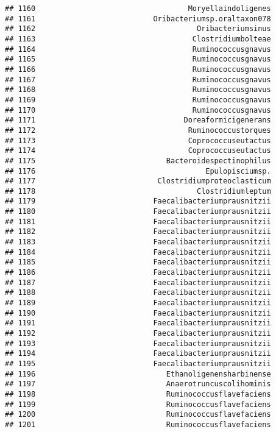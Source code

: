 \documentclass[
]{article}
\begin{document}
\begin{verbatim}
## 1160                                   Moryellaindoligenes
## 1161                           Oribacteriumsp.oraltaxon078
## 1162                                     Oribacteriumsinus
## 1163                                    Clostridiumbolteae
## 1164                                    Ruminococcusgnavus
## 1165                                    Ruminococcusgnavus
## 1166                                    Ruminococcusgnavus
## 1167                                    Ruminococcusgnavus
## 1168                                    Ruminococcusgnavus
## 1169                                    Ruminococcusgnavus
## 1170                                    Ruminococcusgnavus
## 1171                                  Doreaformicigenerans
## 1172                                   Ruminococcustorques
## 1173                                   Coprococcuseutactus
## 1174                                   Coprococcuseutactus
## 1175                              Bacteroidespectinophilus
## 1176                                       Epulopisciumsp.
## 1177                            Clostridiumproteoclasticum
## 1178                                     Clostridiumleptum
## 1179                           Faecalibacteriumprausnitzii
## 1180                           Faecalibacteriumprausnitzii
## 1181                           Faecalibacteriumprausnitzii
## 1182                           Faecalibacteriumprausnitzii
## 1183                           Faecalibacteriumprausnitzii
## 1184                           Faecalibacteriumprausnitzii
## 1185                           Faecalibacteriumprausnitzii
## 1186                           Faecalibacteriumprausnitzii
## 1187                           Faecalibacteriumprausnitzii
## 1188                           Faecalibacteriumprausnitzii
## 1189                           Faecalibacteriumprausnitzii
## 1190                           Faecalibacteriumprausnitzii
## 1191                           Faecalibacteriumprausnitzii
## 1192                           Faecalibacteriumprausnitzii
## 1193                           Faecalibacteriumprausnitzii
## 1194                           Faecalibacteriumprausnitzii
## 1195                           Faecalibacteriumprausnitzii
## 1196                              Ethanoligenensharbinense
## 1197                              Anaerotruncuscolihominis
## 1198                              Ruminococcusflavefaciens
## 1199                              Ruminococcusflavefaciens
## 1200                              Ruminococcusflavefaciens
## 1201                              Ruminococcusflavefaciens

\end{verbatim}
\end{document}
